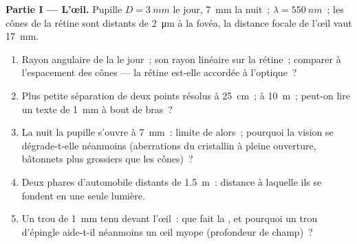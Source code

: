 \begin{problem}
\label{pb:b2:diffraction:1}

\medskip
\noindent\textbf{Partie I --- L'œil.}
Pupille $D = \qty{3}{mm}$ le jour, \qty{7}{mm} la nuit~; $\lambda = \qty{550}{nm}$~; les
cônes de la rétine sont distants de \qty{2}{\micro m} à la fovéa, la distance focale
de l'œil vaut \qty{17}{mm}.
\begin{enumerate}
  \item Rayon angulaire de la  le jour~; son rayon linéaire sur
        la rétine~; comparer à l'espacement des cônes --- la rétine est-elle
        accordée à l'optique~?
  \item Plus petite séparation de deux points résolus à \qty{25}{cm}~; à
        \qty{10}{m}~; peut-on lire un texte de \qty{1}{mm} à bout de bras~?
  \item La nuit la pupille s'ouvre à \qty{7}{mm}~: limite de  alors~;
        pourquoi la vision se dégrade-t-elle néanmoins (aberrations du
        cristallin à pleine ouverture, bâtonnets plus grossiers que les cônes)~?
  \item Deux phares d'automobile distants de \qty{1.5}{m}~: distance à laquelle ils se fondent
        en une seule lumière.
  \item Un trou de \qty{1}{mm} tenu devant l'œil~: que fait la ,
        et pourquoi un trou d'épingle aide-t-il néanmoins un œil myope
        (profondeur de champ)~?
\end{enumerate}


\end{problem}
